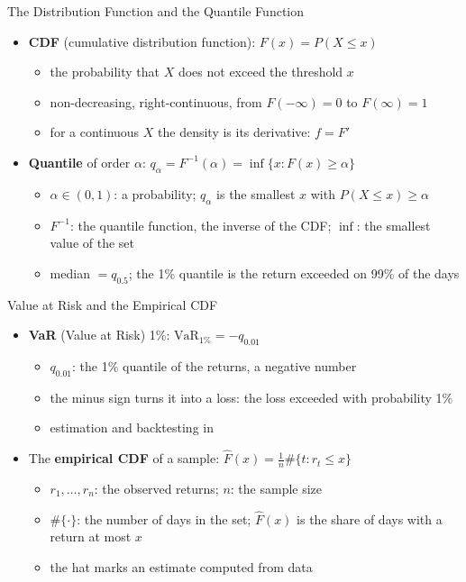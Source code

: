 \begin{frame}{The Distribution Function and the Quantile Function}
\itemsize{\small}
\begin{itemize}
    \item \textbf{CDF} (cumulative distribution function): $F(x) = P(X \le x)$
    \begin{itemize}
        \item the probability that $X$ does not exceed the threshold $x$
        \item non-decreasing, right-continuous, from $F(-\infty) = 0$ to $F(\infty) = 1$
        \item for a continuous $X$ the density is its derivative: $f = F'$
    \end{itemize}
    \item \textbf{Quantile} of order $\alpha$: $q_\alpha = F^{-1}(\alpha) = \inf\{x : F(x) \ge \alpha\}$
    \begin{itemize}
        \item $\alpha \in (0, 1)$: a probability; $q_\alpha$ is the smallest $x$ with $P(X \le x) \ge \alpha$
        \item $F^{-1}$: the quantile function, the inverse of the CDF; $\inf$: the smallest value of the set
        \item median $= q_{0.5}$; the 1\% quantile is the return exceeded on 99\% of the days
    \end{itemize}
\end{itemize}
\end{frame}

\begin{frame}{Value at Risk and the Empirical CDF}
\itemsize{\small}
\begin{itemize}
    \item \textbf{VaR} (Value at Risk) 1\%: $\text{VaR}_{1\%} = -q_{0.01}$
    \begin{itemize}
        \item $q_{0.01}$: the 1\% quantile of the returns, a negative number
        \item the minus sign turns it into a loss: the loss exceeded with probability 1\%
        \item estimation and backtesting in 
    \end{itemize}
    \item The \textbf{empirical CDF} of a sample: $\hat F(x) = \frac1n \#\{t : r_t \le x\}$
    \begin{itemize}
        \item $r_1, \dots, r_n$: the observed returns; $n$: the sample size
        \item $\#\{\cdot\}$: the number of days in the set; $\hat F(x)$ is the share of days with a return at most $x$
        \item the hat marks an estimate computed from data
    \end{itemize}
\end{itemize}
\end{frame}


